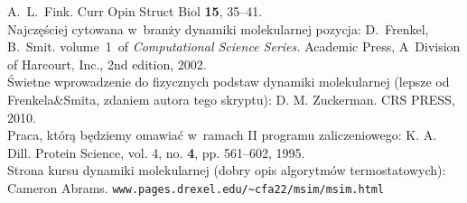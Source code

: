 \begin{thebibliography}{99}

A.~L.~Fink.
\newblock Curr Opin Struct Biol {\bf 15}, 35–41.
\\

Najczęściej cytowana w~branży dynamiki molekularnej pozycja:
D.~Frenkel, B.~Smit.
 volume~1~of {\em Computational Science Series.}
\newblock Academic Press, A~Division of Harcourt, Inc., 2nd edition, 2002.
\\

Świetne wprowadzenie do fizycznych podstaw dynamiki molekularnej (lepsze od Frenkela\&Smita, zdaniem autora tego skryptu):
D. M. Zuckerman.
\newblock CRS PRESS, 2010.
\\

Praca, którą będziemy omawiać w~ramach II programu zaliczeniowego:
K. A. Dill.
\newblock Protein Science, vol. 4, no. {\bf 4}, pp. 561–602, 1995.
\\

Strona kursu dynamiki molekularnej (dobry opis algorytmów termostatowych):
Cameron Abrams.
\newblock \texttt{www.pages.drexel.edu/\textasciitilde cfa22/msim/msim.html}

	
\end{thebibliography}
